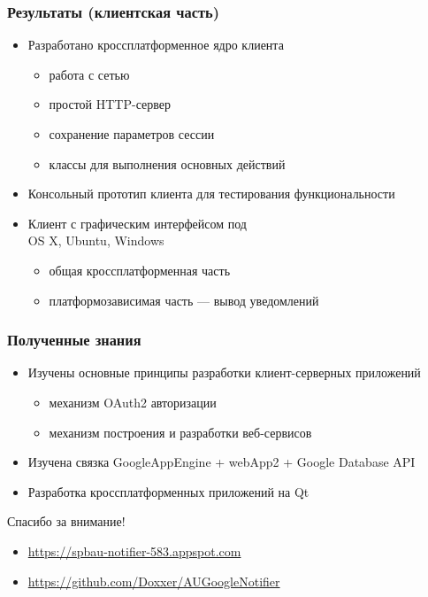 \documentclass[10pt,pdf,hyperref={unicode}]{beamer}
\begin{document}
    \begin{frame}\frametitle{Результаты (клиентская часть)}
        \begin{itemize}%
            \item Разработано кроссплатформенное ядро клиента            	
            \begin{itemize}
                \item работа с сетью
                \item простой HTTP-сервер
                \item сохранение параметров сессии
                \item классы для выполнения основных действий
            \end{itemize}
            \pause
            \item Консольный прототип клиента для тестирования функциональности
            \pause
            \item Клиент с графическим интерфейсом под \\ OS X, Ubuntu, Windows
            \begin{itemize}
                \item общая кроссплатформенная часть
                \item платформозависимая часть --- вывод уведомлений
            \end{itemize}
        \end{itemize}
    \end{frame}

    \begin{frame}\frametitle{Полученные знания}
        \begin{itemize}%
            \item	Изучены основные принципы разработки клиент-серверных приложений
            \begin{itemize}
                \item механизм OAuth2 авторизации
                \item механизм построения и разработки веб-сервисов
            \end{itemize}            
            \item	Изучена связка GoogleAppEngine + webApp2 + Google Database API
            \item	Разработка кроссплатформенных приложений на Qt
        \end{itemize}
    \end{frame}

    \begin{frame}
        \begin{center}
            Спасибо за внимание!
        \end{center}
        \begin{itemize}%
            \item	\url{https://spbau-notifier-583.appspot.com}
            \item	\url{https://github.com/Doxxer/AUGoogleNotifier}
        \end{itemize}

    \end{frame}
\end{document}
